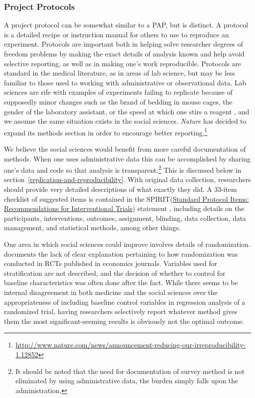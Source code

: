 \documentclass[12pt] {article}
\begin{document}
\subsubsection{Project Protocols}\label{project-protocols}

A project protocol can be somewhat similar to a PAP, but is distinct. A protocol is a detailed recipe or instruction manual for others to use to reproduce an experiment. Protocols are important both in helping solve researcher degrees of freedom problems by making the exact details of analysis known and help avoid selective reporting, as well as in making one's work reproducible. Protocols are standard in the medical literature, as in areas of lab science, but may be less familiar to those used to working with administrative or observational data. Lab sciences are rife with examples of experiments failing to replicate because of supposedly minor changes such as the brand of bedding in mouse cages, the gender of the laboratory assistant, or the speed at which one stirs a reagent \citep{sorge2014olfactory, hines2014sorting}, and we assume the same situation exists in the social sciences. \textit{Nature} has decided to expand its methods section in order to encourage better reporting.\footnote{\url{http://www.nature.com/news/announcement-reducing-our-irreproducibility-1.12852}}

We believe the social sciences would benefit from more careful documentation of methods. When one uses administrative data this can be accomplished by sharing one's data and code so that analysis is transparent.\footnote{It should be noted that the need for documentation of survey method is not eliminated by using administrative data, the burden simply falls upon the administration.} This is discussed below in section~\ref{replication-and-reproducibility}. With original data collection, researchers should provide very detailed descriptions of what exactly they did. A 33-item checklist of suggested items is contained in the SPIRIT(\href{http://www.spirit-statement.org}{Standard Protocol Items: Recommendations for Interventional
Trials}) statement \citep{chan_spirit_2013}, including details on the participants, interventions, outcomes, assignment, blinding, data collection, data management, and statistical methods, among other things. 

One area in which social sciences could improve involves details of randomization. \cite{bruhn_pursuit_2009} documents the lack of clear explanation pertaining to how randomization was conducted in RCTs published in economics journals. Variables used for stratification are not described, and the decision of whether to control for baseline characteristics was often done after the fact. While there seems to be internal disagreement in both
medicine and the social sciences over the appropriateness of including baseline
control variables in regression analysis of a randomized trial, having
researchers selectively report whatever method gives them the most
significant-seeming results is obviously not the optimal outcome. 
\end{document}
